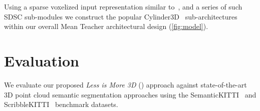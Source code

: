 \documentclass[10pt,twocolumn,letterpaper]{article}
\begin{document}
Using a sparse voxelized input representation similar to~\cite{graham2015sparse}, and a series of such SDSC sub-modules we construct the popular Cylinder3D~\cite{zhu2021cylindrical} sub-architectures within our overall Mean Teacher architectural design (\cref{fig:model}).  \vspace{-0.3cm}   
\section{Evaluation}
\label{sec:experiments}
\noindent
We evaluate our proposed \textit{Less is More 3D} ({\ourmodel}) approach against state-of-the-art 3D point cloud semantic segmentation approaches using the SemanticKITTI~\cite{behley2019semantickittia} and ScribbleKITTI~\cite{Unal_2022_CVPR} benchmark datasets.
\end{document}
